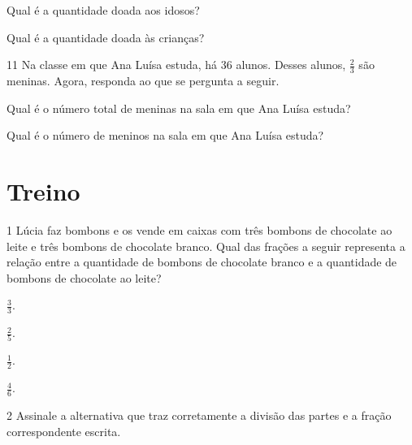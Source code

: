 \begin{escolha}
\item
  Qual é a quantidade doada aos idosos?\\

\item
  Qual é a quantidade doada às crianças?\\
\end{escolha}


\num{11} Na classe em que Ana Luísa estuda, há 36 alunos. Desses alunos, $\frac{2}{3}$
são meninas. Agora, responda ao que se pergunta a seguir.

\begin{escolha}
\item
  Qual é o número total de meninas na sala em que Ana Luísa estuda?\\

\item
  Qual é o número de meninos na sala em que Ana Luísa estuda?\\
\end{escolha}


\pagebreak
\section*{Treino}

\num{1} Lúcia faz bombons e os vende em caixas com três bombons de chocolate ao leite e três bombons de chocolate branco. Qual das frações a seguir representa a relação entre a quantidade de
bombons de chocolate branco e a quantidade de bombons de chocolate ao leite?

\begin{multicols}{2}
\begin{escolha}
\item
  $\frac{3}{3}$.

\item
  $\frac{2}{5}$.

\item
  $\frac{1}{2}$.

\item
  $\frac{4}{6}$.
\end{escolha}
\end{multicols}

\num{2} Assinale a alternativa que traz corretamente a divisão das partes e a
fração correspondente escrita.

